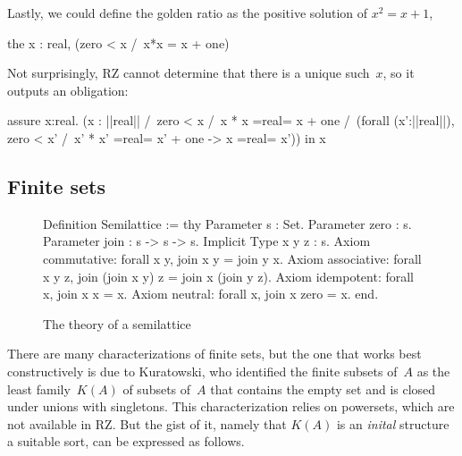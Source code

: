 \iflong
Lastly, we could define the golden ratio as the positive solution of
$x^2 = x + 1$,
%
\begin{source}
the x : real, (zero < x /\ x*x = x + one)
\end{source}
%
Not surprisingly, RZ cannot determine that there is a unique such~$x$,
so it outputs an obligation:
%
\begin{source}
assure x:real.
  (x : ||real|| /\ zero < x /\ x * x =real= x + one /\
     (forall (x':||real||),  zero < x' /\ x' * x' =real= x' + one ->
        x =real= x'))
  in x
\end{source}
\fi %

\subsection{Finite sets}
\label{sec:finite-sets}

\begin{figure}[t]
  \centering
\begin{source}
Definition Semilattice :=
thy
  Parameter s : Set.
  Parameter zero : s.
  Parameter join : s -> s -> s.
  Implicit Type x y z : s.
  Axiom commutative: forall x y,   join x y = join y x.
  Axiom associative: forall x y z, join (join x y) z = join x (join y z).
  Axiom idempotent:  forall x,     join x x = x.
  Axiom neutral:     forall x,     join x zero = x.
end.
\end{source}
  \caption{The theory of a semilattice}
  \label{fig:semilattice}
\end{figure}

There are many characterizations of finite sets, but the one that
works best constructively is due to Kuratowski, who identified the
finite subsets of~$A$ as the least family~$K(A)$ of subsets of~$A$
that contains the empty set and is closed under unions with
singletons. This characterization relies on powersets, which are not
available in RZ. But the gist of it, namely that $K(A)$ is an
\emph{inital} structure a suitable sort, can be expressed as follows.



